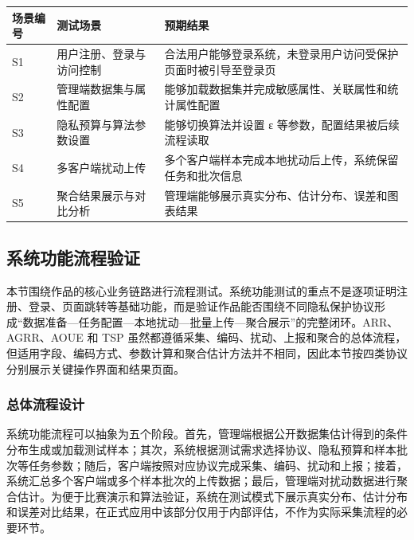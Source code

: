 \documentclass{cumcmthesis}
\numberwithin{equation}{section}
\numberwithin{figure}{section}
\numberwithin{table}{section}
\begin{document}
\begin{table}[htbp]
\centering
\small
\begin{tabularx}{\textwidth}{|>{\raggedright\arraybackslash}X|>{\raggedright\arraybackslash}X|>{\raggedright\arraybackslash}X|}
\hline
场景编号 & 测试场景 & 预期结果 \\ \hline
S1 & 用户注册、登录与访问控制 & 合法用户能够登录系统，未登录用户访问受保护页面时被引导至登录页 \\ \hline
S2 & 管理端数据集与属性配置 & 能够加载数据集并完成敏感属性、关联属性和统计属性配置 \\ \hline
S3 & 隐私预算与算法参数设置 & 能够切换算法并设置 ε 等参数，配置结果被后续流程读取 \\ \hline
S4 & 多客户端扰动上传 & 多个客户端样本完成本地扰动后上传，系统保留任务和批次信息 \\ \hline
S5 & 聚合结果展示与对比分析 & 管理端能够展示真实分布、估计分布、误差和图表结果 \\ \hline
\end{tabularx}
\end{table}

\subsection{系统功能流程验证}

本节围绕作品的核心业务链路进行流程测试。系统功能测试的重点不是逐项证明注册、登录、页面跳转等基础功能，而是验证作品能否围绕不同隐私保护协议形成“数据准备—任务配置—本地扰动—批量上传—聚合展示”的完整闭环。ARR、AGRR、AOUE 和 TSP 虽然都遵循采集、编码、扰动、上报和聚合的总体流程，但适用字段、编码方式、参数计算和聚合估计方法并不相同，因此本节按四类协议分别展示关键操作界面和结果页面。

\subsubsection{总体流程设计}

系统功能流程可以抽象为五个阶段。首先，管理端根据公开数据集估计得到的条件分布生成或加载测试样本；其次，系统根据测试需求选择协议、隐私预算和样本批次等任务参数；随后，客户端按照对应协议完成采集、编码、扰动和上报；接着，系统汇总多个客户端或多个样本批次的上传数据；最后，管理端对扰动数据进行聚合估计。为便于比赛演示和算法验证，系统在测试模式下展示真实分布、估计分布和误差对比结果，在正式应用中该部分仅用于内部评估，不作为实际采集流程的必要环节。
\end{document}
